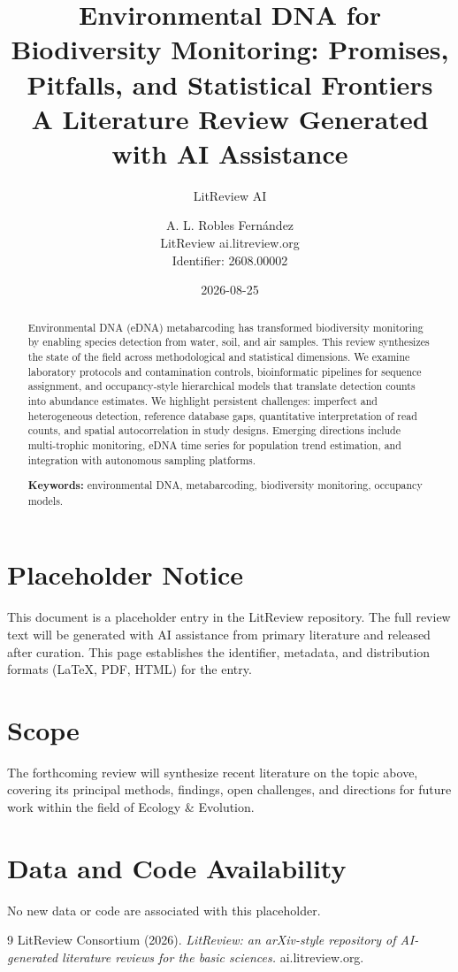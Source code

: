 \documentclass[11pt]{article}
\title{Environmental DNA for Biodiversity Monitoring: Promises, Pitfalls, and Statistical Frontiers\\
\large A Literature Review Generated with AI Assistance}
\author{LitReview AI \and A. L. Robles Fernández\\[4pt]
\small LitReview \textbar{} ai.litreview.org\\
\small Identifier: 2608.00002}
\date{2026-08-25}
\begin{document}
\maketitle

\begin{abstract}
Environmental DNA (eDNA) metabarcoding has transformed biodiversity monitoring by enabling species detection from water, soil, and air samples. This review synthesizes the state of the field across methodological and statistical dimensions. We examine laboratory protocols and contamination controls, bioinformatic pipelines for sequence assignment, and occupancy-style hierarchical models that translate detection counts into abundance estimates. We highlight persistent challenges: imperfect and heterogeneous detection, reference database gaps, quantitative interpretation of read counts, and spatial autocorrelation in study designs. Emerging directions include multi-trophic monitoring, eDNA time series for population trend estimation, and integration with autonomous sampling platforms.

\noindent\textbf{Keywords:} environmental DNA, metabarcoding, biodiversity monitoring, occupancy models.
\end{abstract}

\section*{Placeholder Notice}
This document is a placeholder entry in the LitReview repository. The full
review text will be generated with AI assistance from primary literature and
released after curation. This page establishes the identifier, metadata, and
distribution formats (LaTeX, PDF, HTML) for the entry.

\section*{Scope}
The forthcoming review will synthesize recent literature on the topic above,
covering its principal methods, findings, open challenges, and directions for
future work within the field of Ecology \& Evolution.

\section*{Data and Code Availability}
No new data or code are associated with this placeholder.


\begin{thebibliography}{9}
 LitReview Consortium (2026). \emph{LitReview: an arXiv-style repository of AI-generated literature reviews for the basic sciences.} ai.litreview.org.
\end{thebibliography}
\end{document}
